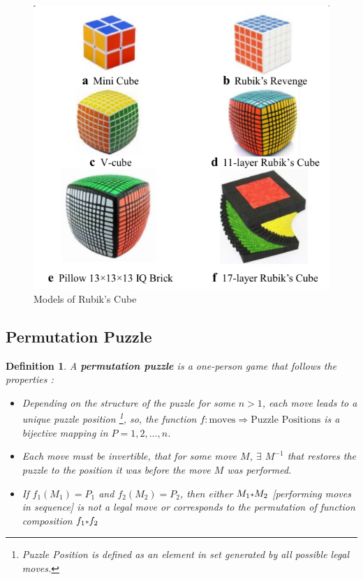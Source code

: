 \documentclass[12pt,a4paper]{article}
\theoremstyle{custom}
\newtheorem*{definition}{Definition}
\begin{document}
\begin{figure}[h]
\centering
\includegraphics[scale=0.5]{Models of R-Cube.png}
\caption{Models of Rubik's Cube \cite{2018ChJME..31...77Z}}
\label{Figure_Mrubik's cube}
\end{figure}
\subsection*{Permutation Puzzle}
\label{PP}
\begin{definition}
    A \textbf{permutation puzzle} is a one-person game that follows the properties \cite{wong2010group} : 
    \begin{itemize}
        \item Depending on the structure of the puzzle for some $n>1$, each move leads to a unique puzzle position \footnote{Puzzle Position is defined as an element in set generated by all possible legal moves.}, so, the function $f: \text{moves} \Rightarrow \text{Puzzle Positions}$ is a bijective mapping in $P= 1,2,...,n$.
        \item Each move must be invertible, that for some move $M$, $\exists$ $M^{-1}$ that restores the puzzle to the position it was before the move $M$ was performed. 
        \item If $f_1(M_1)=P_1$ and $f_2(M_2)=P_2$, then either $M_1 \mathlarger{\scriptstyle*}M_2$ [performing moves in sequence] is not a legal move or corresponds to the permutation of function composition ${f_1} \mathlarger{\scriptstyle*}{f_2}$ 
        
    \end{itemize}
\end{definition}
\end{document}
